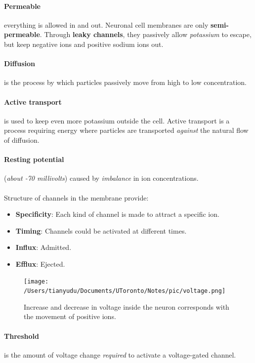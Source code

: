 \documentclass{article}
\begin{document}
 	\paragraph{Permeable} everything is allowed in and out.
 	\newline Neuronal cell membranes are only \textbf{semi-permeable}. Through \textbf{leaky channels}, they passively allow \emph{potassium} to escape, but keep negative ions and positive sodium ions out.
 	\paragraph{Diffusion} is the process by which particles passively move from high to low concentration.
 	\paragraph{Active transport} is used to keep even more potassium outside the cell. Active transport is a process requiring energy where particles are transported \emph{against} the natural flow of diffusion.
 	\paragraph{Resting potential} (\emph{about -70 millivolts}) caused by \emph{imbalance} in ion concentrations.
 	\paragraph{}Structure of channels in the membrane provide: 
 	\begin{itemize}
 		\item \textbf{Specificity}: Each kind of channel is made to attract a specific ion.
 		\item \textbf{Timing}: Channels could be activated at different times.  
 	\end{itemize}
 	\begin{itemize}
 		\item \textbf{Influx}: Admitted.
 		\item \textbf{Efflux}: Ejected.
 	\end{itemize}
 	\begin{figure}[H]
 		\texttt{[image: /Users/tianyudu/Documents/UToronto/Notes/pic/voltage.png]}
 		\caption{Increase and decrease in voltage inside the neuron corresponds with the movement of positive ions.}
 	\end{figure}
	\paragraph{Threshold} is the amount of voltage change \emph{required} to activate a voltage-gated channel.
\end{document}
